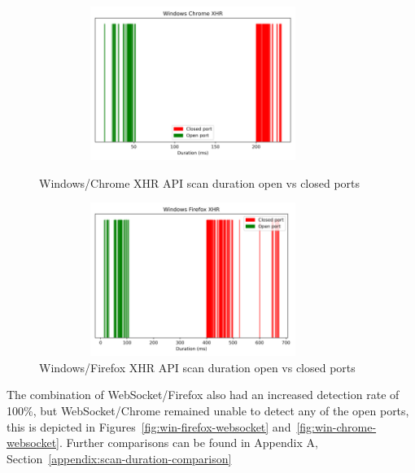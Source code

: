 \begin{figure}[ht]
\centering
\begin{minipage}{.45\textwidth}
  \centering
\includegraphics[width=10cm, height=5cm, keepaspectratio]{port_scanning_techniques/img/windows_chrome_efficacy_xhr.png}
    \caption{Windows/Chrome XHR API scan duration open vs closed ports}
    \label{fig:win-chrome-xhr}
\end{minipage}
\hspace{0.5cm} %
\begin{minipage}{.45\textwidth}
\includegraphics[width=10cm, height=5cm, keepaspectratio]{port_scanning_techniques/img/windows_firefox_efficacy_xhr.png}
    \caption{Windows/Firefox XHR API scan duration open vs closed ports}
    \label{fig:win-firefox-xhr}
\end{minipage}
\end{figure}

The combination of WebSocket/Firefox also had an increased detection rate of 100\%, but WebSocket/Chrome remained unable to detect any of the open ports, this is depicted in Figures~\ref{fig:win-firefox-websocket} and~\ref{fig:win-chrome-websocket}. Further comparisons can be found in Appendix A, Section~\ref{appendix:scan-duration-comparison}

